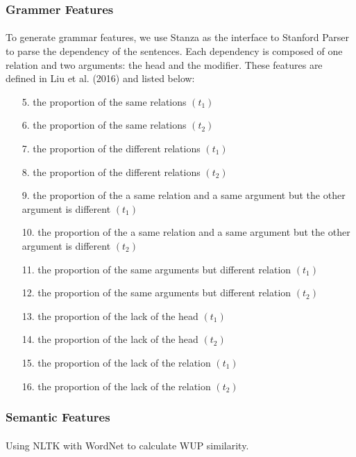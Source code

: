 \documentclass{article}
\begin{document}
\begin{CJK*}{UTF8}{bkai}
\subsubsection{Grammer Features}
\paragraph{}
To generate grammar features, we use Stanza\cite{qi2020stanza} as the interface to Stanford Parser to parse the dependency of the sentences. Each dependency is composed of one relation and two arguments: the head and the modifier. These features are defined in Liu et al. (2016) and listed below:

\begin{enumerate}
    \item[ 5.] the proportion of the same relations $(t_1)$
    \item[ 6.] the proportion of the same relations $(t_2)$
    \item[ 7.] the proportion of the different relations $(t_1)$
    \item[ 8.] the proportion of the different relations $(t_2)$
    \item[ 9.] the proportion of the a same relation and a same argument but the other argument is different $(t_1)$
    \item[10.] the proportion of the a same relation and a same argument but the other argument is different $(t_2)$
    \item[11.] the proportion of the same arguments but different relation $(t_1)$
    \item[12.] the proportion of the same arguments but different relation $(t_2)$
    \item[13.] the proportion of the lack of the head $(t_1)$
    \item[14.] the proportion of the lack of the head $(t_2)$
    \item[15.] the proportion of the lack of the relation $(t_1)$
    \item[16.] the proportion of the lack of the relation $(t_2)$
\end{enumerate}

\subsubsection{Semantic Features}
\paragraph{}
Using NLTK\cite{nltk} with WordNet\cite{wordnet} to calculate WUP similarity\cite{wu-palmer-1994-verb}.


\end{CJK*}
\end{document}
